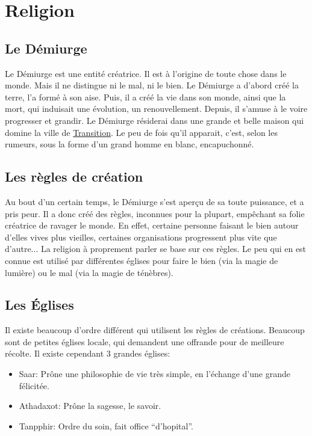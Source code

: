 
\section{Religion}
\subsection{Le Démiurge}
\hypertarget {demiurge}{}Le Démiurge est une entité créatrice. Il est à l'origine de toute chose dans le monde. Mais il ne distingue ni le mal, ni le bien. Le Démiurge a d'abord créé la terre, l'a formé à son aise. Puis, il a créé la vie dans son monde, ainsi que la mort, qui induisait une évolution, un renouvellement. Depuis, il s'amuse à le voire progresser et grandir. Le Démiurge résiderai dans une grande et belle maison qui domine la ville de \hyperlink{transition}{Transition}. Le peu de fois qu'il apparait, c'est, selon les rumeurs, sous la forme d'un grand homme en blanc, encapuchonné.
\subsection{Les règles de création}
Au bout d'un certain temps, le Démiurge s'est aperçu de sa toute puissance, et a pris peur. Il a donc créé des règles, inconnues pour la plupart, empêchant sa folie créatrice de ravager le monde. En effet, certaine personne faisant le bien autour d'elles vives plus vieilles, certaines organisations progressent plus vite que d'autre... La religion à proprement parler se base sur ces règles. Le peu qui en est connue est utilisé par différentes églises pour faire le bien (via la magie de lumière) ou le mal (via la magie de ténèbres).
\subsection{Les Églises}
Il existe beaucoup d'ordre différent qui utilisent les règles de créations. Beaucoup sont de petites églises locale, qui demandent une offrande pour de meilleure récolte.
Il existe cependant 3 grandes églises:
\begin{itemize}
\item Saar: Prône une philosophie de vie très simple, en l'échange d'une grande félicitée.
\item Athadaxot: Prône la sagesse, le savoir.
\item Tanpphir: Ordre du soin, fait office “d'hopital”.
\end{itemize} 